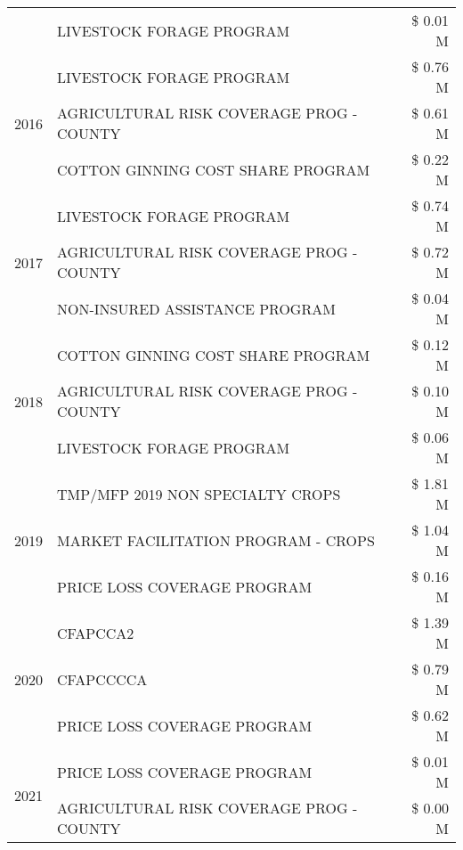 \begin{tabular}{llr}
 & LIVESTOCK FORAGE PROGRAM & \$ 0.01 M \\
\cline{1-3}
\multirow[t]{3}{*}{2016} & LIVESTOCK FORAGE PROGRAM                      & \$ 0.76 M \\
 & AGRICULTURAL RISK COVERAGE PROG - COUNTY      & \$ 0.61 M \\
 & COTTON GINNING COST SHARE PROGRAM             & \$ 0.22 M \\
\cline{1-3}
\multirow[t]{3}{*}{2017} & LIVESTOCK FORAGE PROGRAM & \$ 0.74 M \\
 & AGRICULTURAL RISK COVERAGE PROG - COUNTY & \$ 0.72 M \\
 & NON-INSURED ASSISTANCE PROGRAM & \$ 0.04 M \\
\cline{1-3}
\multirow[t]{3}{*}{2018} & COTTON GINNING COST SHARE PROGRAM & \$ 0.12 M \\
 & AGRICULTURAL RISK COVERAGE PROG - COUNTY & \$ 0.10 M \\
 & LIVESTOCK FORAGE PROGRAM & \$ 0.06 M \\
\cline{1-3}
\multirow[t]{3}{*}{2019} & TMP/MFP 2019 NON SPECIALTY CROPS & \$ 1.81 M \\
 & MARKET FACILITATION PROGRAM - CROPS & \$ 1.04 M \\
 & PRICE LOSS COVERAGE PROGRAM & \$ 0.16 M \\
\cline{1-3}
\multirow[t]{3}{*}{2020} & CFAPCCA2 & \$ 1.39 M \\
 & CFAPCCCCA & \$ 0.79 M \\
 & PRICE LOSS COVERAGE PROGRAM & \$ 0.62 M \\
\cline{1-3}
\multirow[t]{2}{*}{2021} & PRICE LOSS COVERAGE PROGRAM & \$ 0.01 M \\
 & AGRICULTURAL RISK COVERAGE PROG - COUNTY & \$ 0.00 M \\
\cline{1-3}
\bottomrule
\end{tabular}
